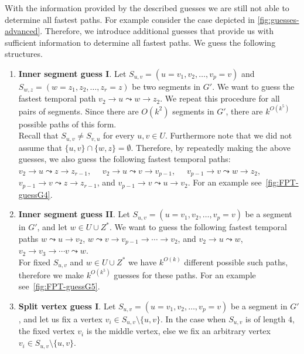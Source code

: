\documentclass[a4paper,UKenglish,cleveref, autoref, thm-restate]{lipics-v2021}
\newcounter{guesscounter}
\begin{document}
With the information provided by the described guesses we are still not able to determine all fastest paths. For example consider the case depicted in \cref{fig:guesses-advanced}. 
Therefore, we introduce additional guesses that provide us with sufficient information to determine all fastest paths.
We guess the following structures.
\begin{enumerate}[G-1.]
	\setcounter{enumi}{\value{guesscounter}}
	\item \label{FPT-guessFTPamongv2z2}
	\textbf{Inner segment guess I}.
	Let $S_{u,v} = (u=v_1,v_2, \dots, v_p = v)$ and $S_{w,z} = (w=z_1,z_2, \dots, z_r = z)$ be two segments in $G'$. %
	We want to guess the fastest temporal path
	$v_2 \rightarrow u \leadsto w \rightarrow z_2$. 
	We repeat this procedure for all pairs of segments.
	Since there are $O(k^2)$ segments in $G'$,
	there are $k^{O(k^5)}$ possible paths of this form. \\
	Recall that $S_{u,v}\neq S_{v,u}$ for every $u,v\in U$. Furthermore note that we did not assume that $\{u,v\} \cap \{w,z\} = \emptyset$. Therefore, by repeatedly making the above guesses, we also guess the following fastest temporal paths: 
	${v_2 \rightarrow u \leadsto z \rightarrow z_{r-1}}$,\ \ \ 
	${v_2 \rightarrow u \leadsto v \rightarrow v_{p-1}}$,\ \ \  
	${v_{p-1} \rightarrow v \leadsto w \rightarrow z_{2}}$,\ \ \  
	${v_{p-1} \rightarrow v \leadsto z \rightarrow z_{r-1}}$, and  
	${v_{p-1} \rightarrow v \leadsto u \rightarrow v_{2}}$.
	For an example see~\cref{fig:FPT-guessG4}.
	\item \label{FPT:guess-uToSegmentz2}
	\textbf{Inner segment guess II}.
	Let $S_{u,v} = (u=v_1,v_2, \dots, v_p = v)$ be a segment in $G'$,
	and let $w \in U \cup Z^*$.
	We want to
	guess the following fastest temporal paths
	$w \leadsto u \rightarrow v_2$, $w \leadsto v \rightarrow v_{p-1} \rightarrow \cdots \rightarrow v_2$,
	and
	$v_2 \rightarrow u \leadsto w$, $v_2 \rightarrow v_3 \rightarrow \cdots v \leadsto w$.
	\\
	For fixed $S_{u,v}$ and $w \in U \cup Z^*$ we have $k^{O(k)}$ different possible such paths, therefore we make $k^{O(k^5)}$ guesses for these paths.
	For an example see~\cref{fig:FPT-guessG5}.
	\item \label{FPT:guess-splitFromAnotherSegmentAndPaths}
	\textbf{Split vertex guess I}.
	Let $S_{u,v} = (u=v_1,v_2, \dots, v_p = v)$ be a segment in $G'$, and let us
	fix a vertex $v_i \in S_{u,v} \setminus \{u,v\}$.
	In the case when $S_{u,v}$ is of length $4$, the fixed vertex $v_i$ is the middle vertex, else we fix an arbitrary vertex $v_i \in S_{u,v} \setminus \{u,v\}$.

\end{enumerate}
\end{document}
